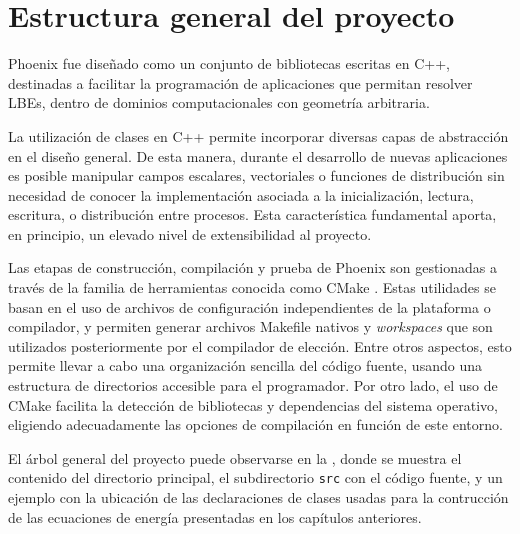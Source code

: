 \section{Estructura general del proyecto}

Phoenix fue dise\~nado como un conjunto de bibliotecas escritas en C++, destinadas a facilitar la programaci\'on de aplicaciones que permitan resolver LBEs, dentro de dominios computacionales con geometr\'ia arbitraria. 

La utilizaci\'on de clases en C++ permite incorporar diversas capas de abstracci\'on en el dise\~no general. De esta manera, durante el desarrollo de nuevas aplicaciones es posible manipular campos escalares, vectoriales o funciones de distribuci\'on sin necesidad de conocer la implementaci\'on asociada a la inicializaci\'on, lectura, escritura, o distribuci\'on entre procesos. Esta caracter\'istica fundamental aporta, en principio, un elevado nivel de extensibilidad al proyecto.

Las etapas de construcci\'on, compilaci\'on y prueba de Phoenix son gestionadas a trav\'es de la familia de herramientas conocida como CMake \cite{noauthor_cmake_nodate}. Estas utilidades se basan en el uso de archivos de configuraci\'on independientes de la plataforma o compilador, y permiten generar archivos Makefile nativos y \emph{workspaces} que son utilizados posteriormente por el compilador de elecci\'on. Entre otros aspectos, esto permite llevar a cabo una organizaci\'on sencilla del c\'odigo fuente, usando una estructura de directorios accesible para el programador. Por otro lado, el uso de CMake facilita la detecci\'on de bibliotecas y dependencias del sistema operativo, eligiendo adecuadamente las opciones de compilaci\'on en funci\'on de este entorno.

El \'arbol general del proyecto puede observarse en la , donde se muestra el contenido del directorio principal, el subdirectorio \texttt{src} con el c\'odigo fuente, y un ejemplo con la ubicaci\'on de las declaraciones de clases usadas para la contrucci\'on de las ecuaciones de energ\'ia presentadas en los cap\'itulos anteriores. 

